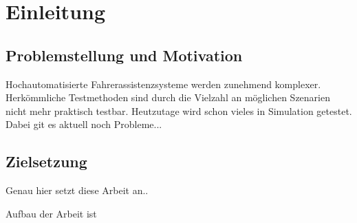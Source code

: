 
\chapter{Einleitung}
\label{einleitung}


\section{Problemstellung und Motivation}
\label{einleitung_problemstellung}

Hochautomatisierte Fahrerassistenzsysteme werden zunehmend komplexer. Herkömmliche Testmethoden sind durch die Vielzahl an möglichen Szenarien nicht mehr praktisch testbar. Heutzutage wird schon vieles in Simulation getestet. Dabei git es aktuell noch Probleme...


\section{Zielsetzung}
\label{einleitung_zielsetzung}

Genau hier setzt diese Arbeit an.. 

Aufbau der Arbeit ist   

